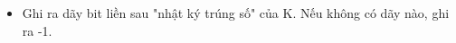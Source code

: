 \begin{itemize}
	\item Ghi ra dãy bit liền sau "nhật ký trúng số" của K. Nếu không có dãy nào, ghi ra -1.
\end{itemize}